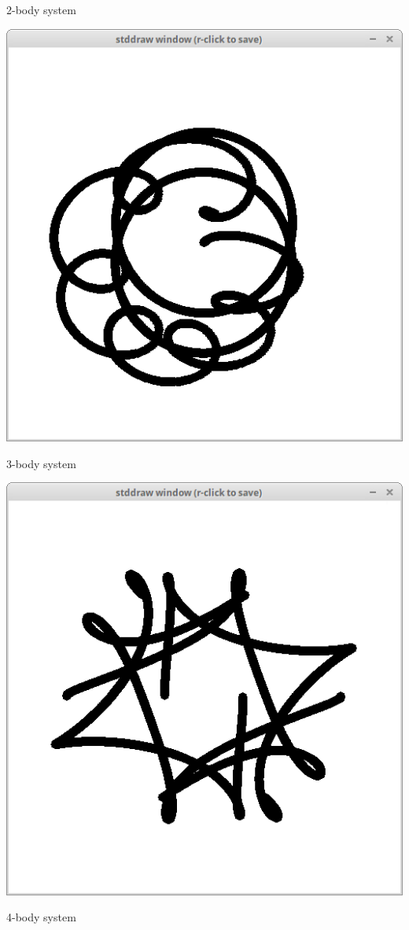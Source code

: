 \documentclass[8pt,a4paper,compress,handout]{beamer}
\begin{document}
\begin{frame}[fragile]
\begin{minipage}{100pt}
\begin{center}
\smallskip

\tiny 2-body system

\smallskip

\includegraphics[scale=0.13]{figures/3body.png}

\smallskip

\tiny 3-body system

\smallskip

\includegraphics[scale=0.13]{figures/4body.png}

\smallskip

\tiny 4-body system
\end{center}
\end{minipage}
\end{frame}
\end{document}
